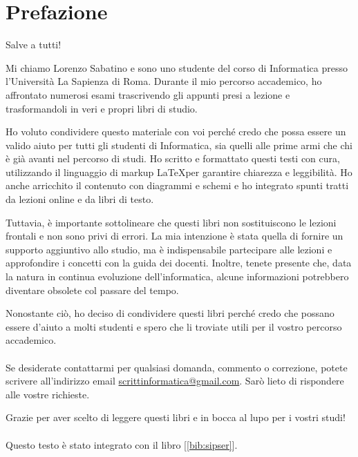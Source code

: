 \chapter*{Prefazione}

Salve a tutti!

Mi chiamo Lorenzo Sabatino e sono uno studente del corso di Informatica presso l'Università La Sapienza di Roma. Durante il mio percorso accademico, ho affrontato numerosi esami trascrivendo gli appunti presi a lezione e trasformandoli in veri e propri libri di studio.

Ho voluto condividere questo materiale con voi perché credo che possa essere un valido aiuto per tutti gli studenti di Informatica, sia quelli alle prime armi che chi è già avanti nel percorso di studi. Ho scritto e formattato questi testi con cura, utilizzando il linguaggio di markup \LaTeX per garantire chiarezza e leggibilità. Ho anche arricchito il contenuto con diagrammi e schemi e ho integrato spunti tratti da lezioni online e da libri di testo.

Tuttavia, è importante sottolineare che questi libri non sostituiscono le lezioni frontali e non sono privi di errori. La mia intenzione è stata quella di fornire un supporto aggiuntivo allo studio, ma è indispensabile partecipare alle lezioni e approfondire i concetti con la guida dei docenti. Inoltre, tenete presente che, data la natura in continua evoluzione dell'informatica, alcune informazioni potrebbero diventare obsolete col passare del tempo.

Nonostante ciò, ho deciso di condividere questi libri perché credo che possano essere d'aiuto a molti studenti e spero che li troviate utili per il vostro percorso accademico.\\\\
Se desiderate contattarmi per qualsiasi domanda, commento o correzione, potete scrivere all'indirizzo email \href{mailto:scrittinformatica@gmail.com}{scrittinformatica@gmail.com}. Sarò lieto di rispondere alle vostre richieste.

Grazie per aver scelto di leggere questi libri e in bocca al lupo per i vostri studi!\\\\
Questo testo è stato integrato con il libro [\ref{bib:sipser}].